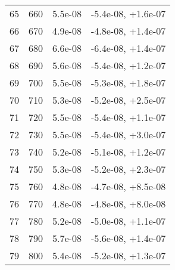 \begin{table}
\begin{adjustbox}{width=1\textwidth/2}
\begin{tabular}{|c|c|c|c|}
\cline{1-4}
65 & 660 & 5.5e-08 & -5.4e-08, +1.6e-07 \\
\cline{1-4}
66 & 670 & 4.9e-08 & -4.8e-08, +1.4e-07 \\
\cline{1-4}
67 & 680 & 6.6e-08 & -6.4e-08, +1.4e-07 \\
\cline{1-4}
68 & 690 & 5.6e-08 & -5.4e-08, +1.2e-07 \\
\cline{1-4}
69 & 700 & 5.5e-08 & -5.3e-08, +1.8e-07 \\
\cline{1-4}
70 & 710 & 5.3e-08 & -5.2e-08, +2.5e-07 \\
\cline{1-4}
71 & 720 & 5.5e-08 & -5.4e-08, +1.1e-07 \\
\cline{1-4}
72 & 730 & 5.5e-08 & -5.4e-08, +3.0e-07 \\
\cline{1-4}
73 & 740 & 5.2e-08 & -5.1e-08, +1.2e-07 \\
\cline{1-4}
74 & 750 & 5.3e-08 & -5.2e-08, +2.3e-07 \\
\cline{1-4}
75 & 760 & 4.8e-08 & -4.7e-08, +8.5e-08 \\
\cline{1-4}
76 & 770 & 4.8e-08 & -4.8e-08, +8.0e-08 \\
\cline{1-4}
77 & 780 & 5.2e-08 & -5.0e-08, +1.1e-07 \\
\cline{1-4}
78 & 790 & 5.7e-08 & -5.6e-08, +1.4e-07 \\
\cline{1-4}
79 & 800 & 5.4e-08 & -5.2e-08, +1.3e-07 \\
\cline{1-4}
\end{tabular}
\end{adjustbox}
\end{table}

